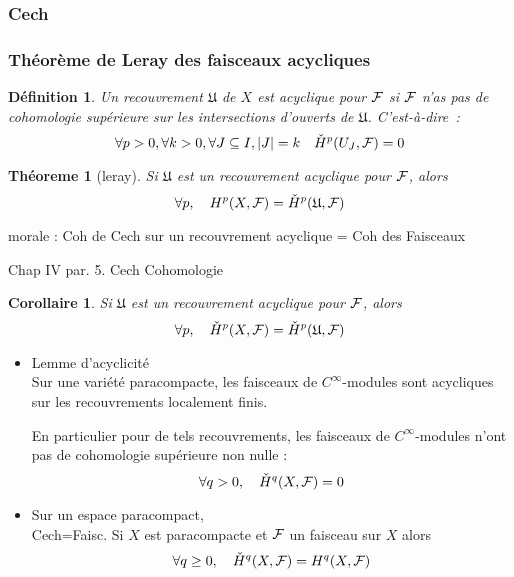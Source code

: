 \documentclass[12pt,makeidx]{amsart}
\newtheorem{cor}{Corollaire}
\newtheorem{thm}{Théoreme}
\newtheorem{defi}{Définition}
\begin{document}
\subsubsection{Cech}
\label{sec-1-2-3}
\subsubsection{Théorème de Leray des faisceaux acycliques}
\label{sec-1-2-4}

\begin{defi}
Un recouvrement $\mathfrak{U}$ de $X$ est acyclique pour $\mathcal{F}$ si $\mathcal{F}$ n'as pas de cohomologie supérieure sur les intersections d'ouverts de $\mathfrak{U}$. C'est-à-dire~:
\[
\forall p>0, \forall k>0, \forall J \subseteq I, \vert J \vert = k \quad
\check{H}^p(U_J,\mathcal{F}) = 0
\]
\end{defi}

\begin{thm}[leray]\label{Thm_Leray}
Si $\mathfrak{U}$ est un recouvrement acyclique pour $\mathcal{F}$, alors
\begin{equation}
\forall p, \quad H^p(X,\mathcal{F}) = \check{H}^p(\mathfrak{U},\mathcal{F})
\end{equation}
\end{thm}
morale : Coh de Cech sur un recouvrement acyclique = Coh des Faisceaux

\cite{Demailly} Chap IV
par. 5. Cech Cohomologie

\begin{cor}
Si $\mathfrak{U}$ est un recouvrement acyclique pour $\mathcal{F}$, alors
\begin{equation}
\forall p, \quad \check{H}^p(X,\mathcal{F}) = \check{H}^p(\mathfrak{U},\mathcal{F})
\end{equation}
\end{cor}
\begin{itemize}

\item Lemme d'acyclicité\\
\label{sec-1-2-4-1}%
Sur une variété paracompacte, les faisceaux de $C^\infty$-modules sont acycliques sur les recouvrements localement finis.

En particulier pour de tels recouvrements, les faisceaux de $C^\infty$-modules n'ont pas de cohomologie supérieure non nulle : 
\begin{equation}
\forall q>0 , \quad \check{H}^q(X,\mathcal{F}) = 0
\end{equation}

\item Sur un espace paracompact,\\
\label{sec-1-2-4-2}%
Cech=Faisc.
Si $X$ est paracompacte et $\mathcal{F}$ un faisceau sur $X$ alors
\begin{equation}
\forall q \geq 0, \quad \check{H}^q(X,\mathcal{F}) = H^q(X,\mathcal{F})
\end{equation}
\end{itemize} %
\end{document}
